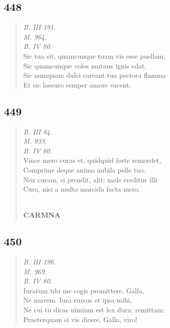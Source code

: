 \documentclass[11pt, a4paper]{report}
\begin{document}
            \subsection*{448}
      \begin{verse}
      \textit{B. III 191.} \\ \textit{M. 964.} \\ \textit{B. IV 80.} \\ Sic tua sit, quamcunque tuam vis esse puellam, \\ Sic quamcunque voles mutuus ignis edat, \\ Sic numquam dulci careant tua pectora flamma \\ Et sic laesuro semper amore vacent. \\ 
      \end{verse}
  
            \subsection*{449}
      \begin{verse}
      \textit{B. III 84.} \\ \textit{M. 933.} \\ \textit{B. IV 80.} \\ Vince mero curas et, quidquid forte remordet, \\ Comprime deque animo nubila pelle tuo. \\ Nox curam, si prendit, alit: male creditur illi \\ Cura, nisi a multo marcida facta mero. \\ 
        ﻿\pagebreak 
    \begin{center} \textbf{CARMNA} \end{center} \marginpar{[336]} 
      \end{verse}
  
            \subsection*{450}
      \begin{verse}
      \textit{B. III 196.} \\ \textit{M. 969.} \\ \textit{B. IV 80.} \\ Iuratum tibi me cogis promittere, Galla, \\ Ne narrem. Iura rursus et ipsa mihi, \\ Ne cui tu dicas nimium est lex dura; remittam: \\ Praeterquam si vis dicere, Galla, viro! \\ 
      \end{verse}
  
\end{document}
